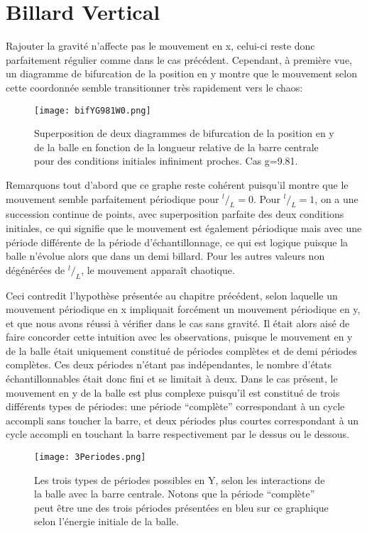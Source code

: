 \documentclass[a4paper]{report}
\begin{document}
\section{Billard Vertical}
Rajouter la gravité n'affecte pas le mouvement en x, celui-ci reste donc parfaitement régulier comme dans le cas précédent. Cependant, à première vue, un diagramme de bifurcation de la position en y montre que le mouvement selon cette coordonnée semble transitionner très rapidement vers le chaos:
\begin{figure}[h]
   \texttt{[image: bifYG981W0.png]}
      \caption[Diagramme de Bifurcation en y: g=9.81 ]{Superposition de deux diagrammes de bifurcation de la position en y de la balle en fonction de la longueur relative de la barre centrale pour des conditions initiales infiniment proches. Cas g=9.81.}
\end{figure}
Remarquons tout d'abord que ce graphe reste cohérent puisqu'il montre que le mouvement semble parfaitement périodique pour \(^l/_L=0\). Pour \(^l/_L=1\), on a une succession continue de points, avec superposition parfaite des deux conditions initiales, ce qui signifie que le mouvement est également périodique mais avec une période différente de la période d'échantillonnage, ce qui est logique puisque la balle n'évolue alors que dans un demi billard. Pour les autres valeurs non dégénérées de \(^l/_L\), le mouvement apparaît chaotique.

Ceci contredit l'hypothèse présentée au chapitre précédent, selon laquelle un mouvement périodique en x impliquait forcément un mouvement périodique en y, et que nous avons réussi à vérifier dans le cas sans gravité. Il était alors aisé de faire concorder cette intuition avec les observations, puisque le mouvement en y de la balle était uniquement constitué de périodes complètes et de demi périodes complètes. Ces deux périodes n'étant pas indépendantes, le nombre d'états échantillonnables était donc fini et se limitait à deux. Dans le cas présent, le mouvement en y de la balle est plus complexe puisqu'il est constitué de trois différents types de périodes: une période ``complète'' correspondant à un cycle accompli sans toucher la barre, et deux périodes plus courtes correspondant à un cycle accompli en touchant la barre respectivement par le dessus ou le dessous.
\begin{figure}[h!]
   \texttt{[image: 3Periodes.png]}
      \caption[Les trois types de périodes possible en Y]{Les trois types de périodes possibles en Y, selon les interactions de la balle avec la barre centrale. Notons que la période ``complète'' peut être une des trois périodes présentées en bleu sur ce graphique selon l'énergie initiale de la balle.}
   \label{fig:typesPeriodes}
\end{figure}
\end{document}

